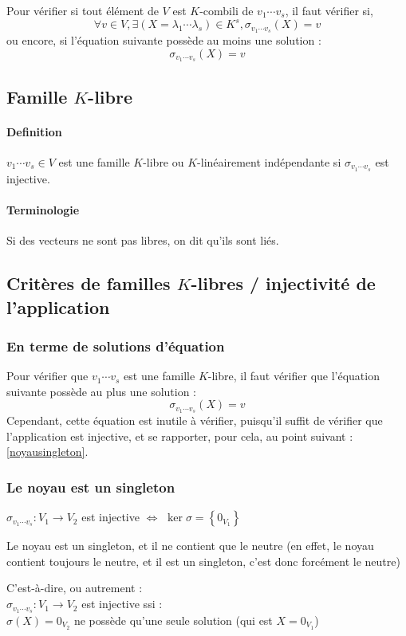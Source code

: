 \documentclass[a4paper,10pt]{article}
\newcommand{\ap}{ \rightarrow} %
\newcommand{\set}[1]{\left\lbrace #1 \right\rbrace } %
\begin{document}
   Pour vérifier si tout élément de $V$ est $K$-combili de $v_1 \cdots v_s$, il faut vérifier si, $$\forall v \in V, \exists (X=\lambda_1 \cdots \lambda_s) \in K^s, \sigma_{v_1 \cdots v_s}(X) = v$$
   ou encore, si l'équation suivante possède au moins une solution :
   $$\sigma_{v_1 \cdots v_s}(X)=v$$

  \subsection{Famille $K$-libre}
   \paragraph{Definition} $v_1 \cdots v_s \in V$ est une famille $K$-libre ou $K$-linéairement indépendante si $\sigma_{v_1 \cdots v_s}$ est injective.
   
   \paragraph{Terminologie} Si des vecteurs ne sont pas libres, on dit qu'ils sont liés.

  \subsection{Critères de familles $K$-libres / injectivité de l'application}
   \subsubsection{En terme de solutions d'équation}
    Pour vérifier que $v_1 \cdots v_s$ est une famille $K$-libre, il faut vérifier que l'équation suivante possède au plus une solution :
    $$\sigma_{v_1 \cdots v_s}(X)=v$$
    Cependant, cette équation est inutile à vérifier, puisqu'il suffit de vérifier que l'application est injective, et se rapporter, pour cela, au point suivant : \ref{noyausingleton}.
   \subsubsection{Le noyau est un singleton \label{noyausingleton}}
    $\sigma_{v_1 \cdots v_s} : V_1 \ap V_2$ est injective $\Leftrightarrow$ $\ker \sigma=\set{0_{V_1}}$

    Le noyau est un singleton, et il ne contient que le neutre (en effet, le noyau contient toujours le neutre, et il est un singleton, c'est donc forcément le neutre)

    C'est-à-dire, ou autrement :\\
    $\sigma_{v_1 \cdots v_s} : V_1 \ap V_2$ est injective ssi :\\
    $\sigma(X)=0_{V_2}$ ne possède qu'une seule solution (qui est $X=0_{V_1}$)
\end{document}
